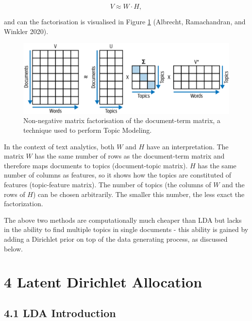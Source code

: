 \documentclass[
]{article}
\begin{document}
\begin{equation}
V \approx W \cdot H,
\end{equation}

and can the factorisation is visualised in Figure \ref{fig:nmf}
(Albrecht, Ramachandran, and Winkler 2020).

\begin{figure}

{\centering \includegraphics[width=1\linewidth]{images/lsa} 

}

\caption{Non-negative matrix factorisation of the document-term matrix, a technique used to perform Topic Modeling.}\label{fig:nmf}
\end{figure}

In the context of text analytics, both \(W\) and \(H\) have an
interpretation. The matrix \(W\) has the same number of rows as the
document-term matrix and therefore maps documents to topics
(document-topic matrix). \(H\) has the same number of columns as
features, so it shows how the topics are constituted of features
(topic-feature matrix). The number of topics (the columns of \(W\) and
the rows of \(H\)) can be chosen arbitrarily. The smaller this number,
the less exact the factorization.

The above two methods are computationally much cheaper than LDA but
lacks in the ability to find multiple topics in single documents - this
ability is gained by adding a Dirichlet prior on top of the data
generating process, as discussed below.

\newpage

\hypertarget{latent-dirichlet-allocation}{%
\section{4 Latent Dirichlet
Allocation}\label{latent-dirichlet-allocation}}

\hypertarget{lda-introduction}{%
\subsection{4.1 LDA Introduction}\label{lda-introduction}}
\end{document}
